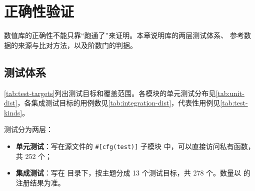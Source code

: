 \chapter{正确性验证}
\label{ch:validation}

数值库的正确性不能只靠“跑通了”来证明。本章说明库的两层测试体系、
参考数据的来源与比对方法，以及阶数门的判据。

\section{测试体系}
\label{sec:test-system}

\cref{tab:test-targets}列出测试目标和覆盖范围。各模块的单元测试分布见\cref{tab:unit-dist}，各集成测试目标的用例数见\cref{tab:integration-dist}，代表性用例见\cref{tab:test-kinds}。

测试分为两层：
\begin{itemize}
    \item \textbf{单元测试}：写在源文件的 \texttt{\#[cfg(test)]} 子模块
          中，可以直接访问私有函数，共 252 个；
    \item \textbf{集成测试}：写在  目录下，按主题分成
          13 个测试目标，共 278 个。数量以  的注册结果为准。
\end{itemize}

